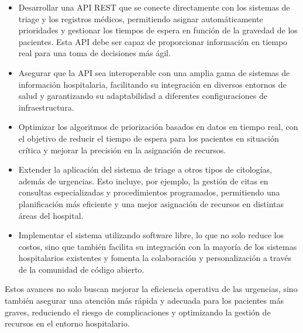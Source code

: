 \begin{itemize}
    \item Desarrollar una API REST que se conecte directamente con los sistemas de triage y los registros médicos, permitiendo asignar automáticamente prioridades y gestionar los tiempos de espera en función de la gravedad de los pacientes. Esta API debe ser capaz de proporcionar información en tiempo real para una toma de decisiones más ágil.
    \item Asegurar que la API sea interoperable con una amplia gama de sistemas de información hospitalaria, facilitando su integración en diversos entornos de salud y garantizando su adaptabilidad a diferentes configuraciones de infraestructura.
    \item Optimizar los algoritmos de priorización basados en datos en tiempo real, con el objetivo de reducir el tiempo de espera para los pacientes en situación crítica y mejorar la precisión en la asignación de recursos.
    \item Extender la aplicación del sistema de triage a otros tipos de citologías, además de urgencias. Esto incluye, por ejemplo, la gestión de citas en consultas especializadas y procedimientos programados, permitiendo una planificación más eficiente y una mejor asignación de recursos en distintas áreas del hospital.
    \item Implementar el sistema utilizando software libre, lo que no solo reduce los costos, sino que también facilita su integración con la mayoría de los sistemas hospitalarios existentes y fomenta la colaboración y personalización a través de la comunidad de código abierto.
\end{itemize}

Estos avances no solo buscan mejorar la eficiencia operativa de las urgencias, sino también asegurar una atención más rápida y adecuada para los pacientes más graves, reduciendo el riesgo de complicaciones y optimizando la gestión de recursos en el entorno hospitalario.

